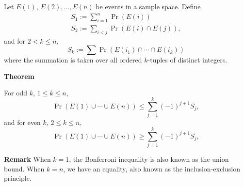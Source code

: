 \documentclass[12pt]{article}
\begin{document}
Let $E(1)$, $E(2),\ldots, E(n)$ be events in a sample space. Define
\begin{align*}
 S_1 := \sum_{i=1}^n \Pr(E(i)) \\
 S_2 := \sum_{i<j} \Pr(E(i) \cap E(j)),
\end{align*}
and for $2<k\leq n$,
\[
  S_k := \sum \Pr(E(i_1)\cap \cdots \cap E(i_k) )
\]
where the summation is taken over all ordered $k$-tuples of distinct integers.

{\bf Theorem}

For odd $k$, $1 \leq k \leq n$,
\[
\Pr(E(1)\cup\cdots\cup E(n)) \leq \sum_{j=1}^k (-1)^{j+1} S_j, 
\]
and for even $k$, $2\leq k \leq n$,
\[
\Pr(E(1)\cup\cdots\cup E(n)) \geq \sum_{j=1}^k (-1)^{j+1} S_j, 
\]


{\bf Remark} When $k=1$, the Bonferroni inequality is also known as the union bound. 
When $k=n$, we have an equality, also known as the inclusion-exclusion principle.
\end{document}

